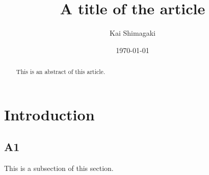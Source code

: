 \documentclass[11pt]{article}
\begin{document}
%
\title{A title of the article}
\author{Kai Shimagaki}
\date{\today}
\maketitle
\begin{abstract}
This is an abstract of this article.
\end{abstract}
\section{Introduction}
\subsection{A1}
This is a subsection of this section.
%
\end{document}
